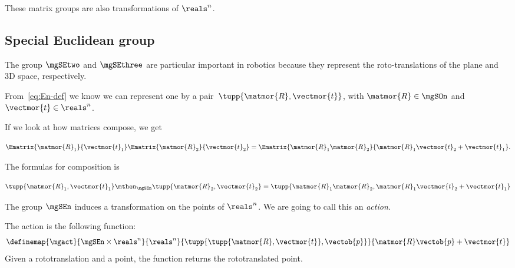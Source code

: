 These matrix groups are also transformations of $\reals^n$.

\subsection{Special Euclidean group}

The group $\mgSEtwo$ and $\mgSEthree$ are particular important in robotics because they represent
the roto-translations of the plane and 3D space, respectively.

From~\cref{eq:En-def} we know we can represent one by a pair~$\tupp{\matmor{R}, \vectmor{t}}$, with $\matmor{R}\in\mgSOn$ and~$\vectmor{t} \in \reals^n$.

If we look at how matrices compose, we get

\begin{equation}
\Ematrix{\matmor{R}_1}{\vectmor{t}_1} \Ematrix{\matmor{R}_2}{\vectmor{t}_2} = \Ematrix{\matmor{R}_1 \matmor{R}_2}{\matmor{R}_1\vectmor{t}_2 + \vectmor{t}_1}.
\end{equation}

The formulas for composition is

\begin{equation}
  \tupp{\matmor{R}_1, \vectmor{t}_1} \mthen_{\mgSEn} \tupp{\matmor{R}_2, \vectmor{t}_2}  = \tupp{\matmor{R}_1 \matmor{R}_2, \matmor{R}_1 \vectmor{t}_2 + \vectmor{t}_1}
\end{equation}

%

The group $\mgSEn$ induces a transformation on the points of  $\reals^n$.
We are going to call this an \emph{action}.

The action is the following function:
\begin{equation}
\definemap{\mgact}{\mgSEn \times \reals^n}{\reals^n}{\tupp{ \tupp{\matmor{R}, \vectmor{t}}, \vectob{p}}}{\matmor{R}\vectob{p} + \vectmor{t}}
\end{equation}
Given a rototranslation and a point, the function returns the rototranslated point.
%

